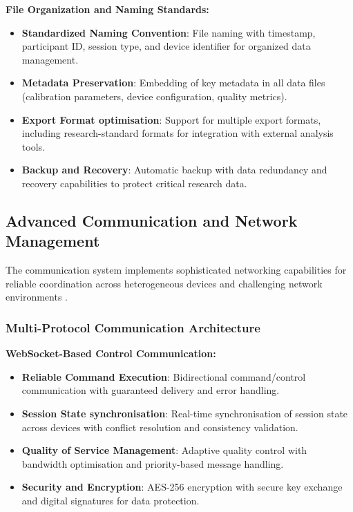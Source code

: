 \documentclass[11pt,a4paper]{report}
\begin{document}
\textbf{File Organization and Naming Standards:}
\begin{itemize}
  \item \textbf{Standardized Naming Convention}: File naming with timestamp, participant ID, session type, and device identifier for organized data management.
  \item \textbf{Metadata Preservation}: Embedding of key metadata in all data files (calibration parameters, device configuration, quality metrics).
  \item \textbf{Export Format optimisation}: Support for multiple export formats, including research-standard formats for integration with external analysis tools.
  \item \textbf{Backup and Recovery}: Automatic backup with data redundancy and recovery capabilities to protect critical research data.
\end{itemize}

\subsection{Advanced Communication and Network Management}

The communication system implements sophisticated networking capabilities for reliable coordination across heterogeneous devices and challenging network environments \cite{Tanenbaum2010}.

\subsubsection{Multi-Protocol Communication Architecture}

\textbf{WebSocket-Based Control Communication:}
\begin{itemize}
  \item \textbf{Reliable Command Execution}: Bidirectional command/control communication with guaranteed delivery and error handling.
  \item \textbf{Session State synchronisation}: Real-time synchronisation of session state across devices with conflict resolution and consistency validation.
  \item \textbf{Quality of Service Management}: Adaptive quality control with bandwidth optimisation and priority-based message handling.
  \item \textbf{Security and Encryption}: AES-256 encryption with secure key exchange and digital signatures for data protection.
\end{itemize}
\end{document}
